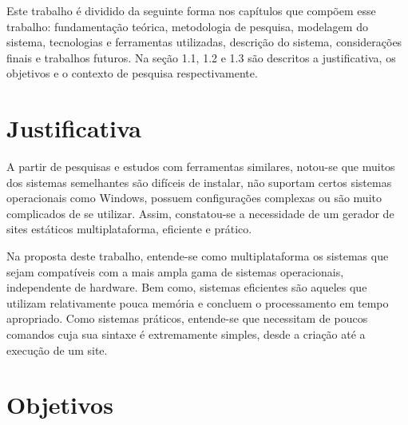 \documentclass[ppginf, pep]{esinucpel}
\begin{document}


Este trabalho é dividido da seguinte forma nos capítulos que compõem esse trabalho: fundamentação teórica, metodologia de pesquisa, modelagem do sistema, tecnologias e ferramentas utilizadas, descrição do sistema, considerações finais e trabalhos futuros. Na seção 1.1, 1.2 e 1.3 são descritos a justificativa, os objetivos e o contexto de pesquisa respectivamente.

\section{Justificativa}

A partir de pesquisas e estudos com ferramentas similares, notou-se que muitos dos sistemas semelhantes são difíceis de instalar, não suportam certos sistemas operacionais como Windows, possuem configurações complexas ou são muito complicados de se utilizar. Assim, constatou-se a necessidade de um gerador de sites estáticos multiplataforma, eficiente e prático.

Na proposta deste trabalho, entende-se como multiplataforma os sistemas que sejam compatíveis com a mais ampla gama de sistemas operacionais, independente de hardware. Bem como, sistemas eficientes são aqueles que utilizam relativamente pouca memória e concluem o processamento em tempo apropriado. Como sistemas práticos, entende-se que necessitam de poucos comandos cuja sua sintaxe é extremamente simples, desde a criação até a execução de um site.

\section{Objetivos}
\end{document}
